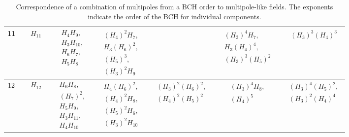 \begin{table}[H]
\begin{tabular}{ccccccc}
  \hline
  11 & $\begin{aligned}&H_{11}\end{aligned}$ & $\begin{aligned}&H_{4}H_{9},\\&H_{3}H_{10},\\&H_{6}H_{7},\\&H_{5}H_{8}\end{aligned}$ & $\begin{aligned}&(H_{4})^2H_{7},\\&H_{3}(H_{6})^2,\\&(H_{5})^3,\\&(H_{3})^2H_{9}\end{aligned}$ &  & $\begin{aligned}&(H_{3})^4H_{7},\\&H_{3}(H_{4})^4,\\&(H_{3})^3(H_{5})^2\end{aligned}$ & $\begin{aligned}&(H_{3})^3(H_{4})^3\end{aligned}$ \\
  \hline
  12 & $\begin{aligned}&H_{12}\end{aligned}$ & $\begin{aligned}&H_{6}H_{8},\\&(H_{7})^2,\\&H_{5}H_{9},\\&H_{3}H_{11},\\&H_{4}H_{10}\end{aligned}$ & $\begin{aligned}&H_{4}(H_{6})^2,\\&(H_{4})^2H_{8},\\&(H_{5})^2H_{6},\\&(H_{3})^2H_{10}\end{aligned}$ & $\begin{aligned}&(H_{3})^2(H_{6})^2,\\&(H_{4})^2(H_{5})^2\end{aligned}$ & $\begin{aligned}&(H_{3})^4H_{8},\\&(H_{4})^5\end{aligned}$ & $\begin{aligned}&(H_{3})^4(H_{5})^2,\\&(H_{3})^2(H_{4})^4\end{aligned}$ \\
  \bottomrule
  \end{tabular}
  \caption{Correspondence of a combination of multipoles from a BCH order to multipole-like fields.
  The exponents indicate the order of the BCH for individual components.}
  \label{table:appendix:transfer_maps:bch_resulting_orders_combination}
\end{table}


